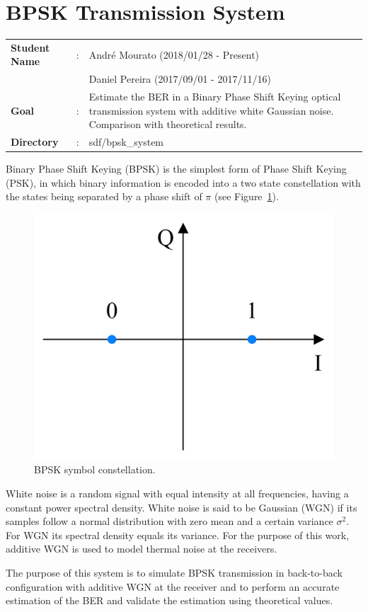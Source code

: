 \clearpage
\section{BPSK Transmission System}

\begin{tcolorbox}	
\begin{tabular}{p{2.75cm} p{0.2cm} p{10.5cm}} 	
\textbf{Student Name}  &:&  Andr\'e Mourato (2018/01/28 - Present)\\
\textbf{}  & &  Daniel Pereira (2017/09/01 - 2017/11/16)\\
\textbf{Goal}          &:& Estimate the BER in a Binary Phase Shift Keying optical transmission system with additive white Gaussian noise. Comparison with theoretical results.\\
\textbf{Directory}              &:& sdf/bpsk\_system
\end{tabular}
\end{tcolorbox}

Binary Phase Shift Keying (BPSK) is the simplest form of Phase Shift Keying (PSK), in which binary information is encoded into a two state constellation with the states being separated by a phase shift of $\pi$ (see Figure~\ref{fig:BPSKConst}).

\begin{figure}[h]
\centering
\includegraphics[width=.4\linewidth]{./sdf/bpsk_system/figures/bpskconstellation.jpg}
\caption{BPSK symbol constellation.}
\label{fig:BPSKConst}
\end{figure}

\par
White noise is a random signal with equal intensity at all frequencies, having a constant power spectral density. White noise is said to be Gaussian (WGN) if its samples follow a normal distribution with zero mean and a certain variance $\sigma^2$. For WGN its spectral density equals its variance. For the purpose of this work, additive WGN is used to model thermal noise at the receivers.
\par
The purpose of this system is to simulate BPSK transmission in back-to-back configuration with additive WGN at the receiver and to perform an accurate estimation of the BER and validate the estimation using theoretical values.

